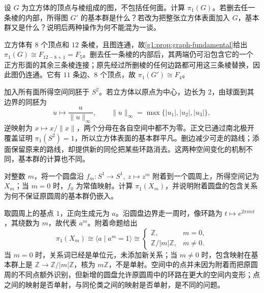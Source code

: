 \begin{exercise}\label{g1:ex:cube-graph}
	设 \(G\) 为立方体的顶点与棱组成的图，不包括任何面。计算 \(\pi_1(G)\)。若删去任一条棱的内部，所得图 \(G'\) 的基本群是什么？若改为把整张立方体表面加入 \(G\)，基本群又是什么？说明后两种操作为何不能混为一谈。
\end{exercise}
\begin{solution}
	立方体有 \(8\) 个顶点和 \(12\) 条棱，且图连通，故\cref{g1:prop:graph-fundamental}给出 \(\pi_1(G)\cong F_{12-8+1}=F_5\)。删去任一条棱的内部后，其两端仍可沿包含它的一个正方形面的其余三条棱连接；原先经过所删棱的任何边路都可用这三条棱替换，因此图仍连通。它有 \(11\) 条边、\(8\) 个顶点，故 \(\pi_1(G')\cong F_4\)。

	加入所有面所得空间同胚于 \(S^2\)。若立方体以原点为中心，边长为 \(2\)，由球面到其边界的同胚为
	\[
		u\longmapsto\frac{u}{\lVert u\rVert_\infty},\qquad
		\lVert u\rVert_\infty=\max\{|u_1|,|u_2|,|u_3|\},
	\]
	逆映射为 \(x\mapsto x/\lVert x\rVert\)，两个分母在各自空间中都不为零。正文已通过南北极开覆盖证明 \(\pi_1(S^2)=1\)，所以立方体表面的基本群平凡。删边减少可走的路线；添面保留原来的路线，却提供新的同伦把某些环路消去。这两种空间变化的机制不同，基本群的计算也不同。
\end{solution}

\begin{exercise}\label{g1:ex:degree-disk-attachment}
	对整数 \(m\)，将一个圆盘沿 \(f_m:S^1\to S^1,\ z\mapsto z^m\) 附着到一个圆周上，所得空间记为 \(X_m\)；当 \(m=0\) 时，\(f_0\) 为常值映射。计算 \(\pi_1(X_m)\)，并说明附着圆盘的包含关系为何不保证原圆周的基本群仍嵌入。
\end{exercise}
\begin{solution}
	取圆周上的基点 \(1\)，正向生成元为 \(a\)。沿圆盘边界走一周时，像环路为 \(t\mapsto e^{2\pi imt}\)，其绕数为 \(m\)，故代表 \(a^m\)。附着命题给出
	\[
		\pi_1(X_m)\cong\langle a\mid a^m=1\rangle
		\cong
		\begin{cases}
			\mathbb Z,&m=0,\\
			\mathbb Z/|m|\mathbb Z,&m\ne0.
		\end{cases}
	\]
	当 \(m=0\) 时，关系词已经是单位元，未添加新关系；当 \(m\ne0\) 时，包含映射在基本群上是 \(\mathbb Z\to\mathbb Z/|m|\mathbb Z\)，核为 \(m\mathbb Z\)，不是单射。空间中的点并未因为附着而把原圆周的不同点额外识别，但新增的圆盘允许原圆周中的环路在更大的空间内变形；点之间的映射是否单射，与同伦类之间的映射是否单射，是不同的问题。
\end{solution}

